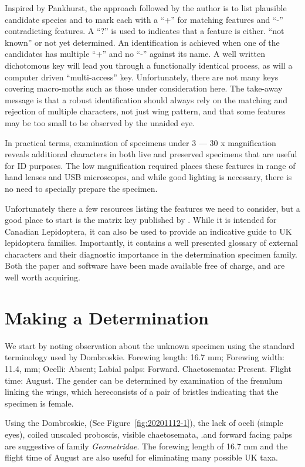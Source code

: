 \documentclass[]{article}
\begin{document}
 Inspired by Pankhurst, the approach followed by the author is to list plausible candidate species and to mark each with a \enquote{+} for matching features and \enquote{-} contradicting features. A \enquote{?} is used to  indicates that a feature is either. \enquote{not known} or not yet determined. An identification is achieved when one of the candidates has multiple \enquote{+} and no \enquote{-} against its name.
 A well written dichotomous key will lead you through a functionally identical process, as will a computer driven \enquote{multi-access} key. Unfortunately, there are not many keys covering macro-moths such as those under consideration here.
 The take-away message is that a robust identification should always rely on the matching and rejection of multiple characters, not just wing pattern, and that some features  may be too small to be observed by the unaided eye.  
 
 In practical terms,  examination of specimens under  3 --- 30 x magnification reveals additional characters  in both live and preserved specimens that are useful for ID purposes. The low magnification required places these features in range of hand lenses and USB microscopes, and while good lighting is necessary, there is no need to specially prepare the specimen.
 
 Unfortunately there a few resources listing the features we need to consider, but a good place to start is the matrix key published by \citet{Dombroskie2011}. While it is intended for Canadian Lepidoptera, it can also be used to provide an indicative guide to UK lepidoptera families. Importantly, it contains a well presented glossary of external characters and their diagnostic importance in the determination specimen family. Both the paper and software have been made available free of charge, and are well worth acquiring.
 
\section*{Making a Determination}
We start by noting observation about the unknown specimen using the standard terminology used by Dombroskie.
Forewing length: 16.7 mm; Forewing width: 11.4, mm;  Ocelli: Absent;  Labial palps: Forward. Chaetosemata:  Present. Flight time: August. The gender can be determined by examination of the frenulum linking the wings, which hereconsists of a pair of bristles indicating that the specimen is female.

Using the Dombroskie, (See Figure~\ref{fig:20201112-1}), the lack of oceli (simple eyes), coiled unscaled proboscis, visible chaetosemata, .and forward facing palps are suggestive of family \textit{Geometridae}. The forewing length of 16.7 mm and the flight time of August are also useful for eliminating many possible UK taxa.
\end{document}
